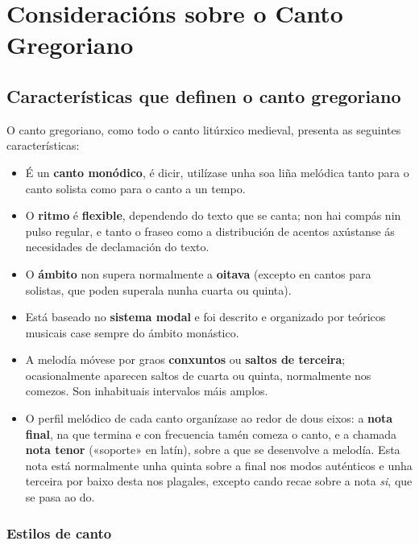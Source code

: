 \documentclass[a4paper, twoside]{templates/ociamthesis}
\providecommand{\tightlist}{%
  \setlength{\itemsep}{0pt}\setlength{\parskip}{0pt}}
\begin{document}
\newpage

\hypertarget{consideraciuxf3ns-sobre-o-canto-gregoriano}{%
\section{Consideracións sobre o Canto Gregoriano}\label{consideraciuxf3ns-sobre-o-canto-gregoriano}}

\hypertarget{caracteruxedsticas-que-definen-o-canto-gregoriano}{%
\subsection{Características que definen o canto gregoriano}\label{caracteruxedsticas-que-definen-o-canto-gregoriano}}

O canto gregoriano, como todo o canto litúrxico medieval, presenta as seguintes características:

\begin{itemize}
\tightlist
\item
  É un \textbf{canto monódico}, é dicir, utilízase unha soa liña melódica tanto para o canto solista como para o canto a un tempo.
\item
  O \textbf{ritmo} é \textbf{flexible}, dependendo do texto que se canta; non hai compás nin pulso regular, e tanto o fraseo como a distribución de acentos axústanse ás necesidades de declamación do texto.
\item
  O \textbf{ámbito} non supera normalmente a \textbf{oitava} (excepto en cantos para solistas, que poden superala nunha cuarta ou quinta).
\item
  Está baseado no \textbf{sistema modal} e foi descrito e organizado por teóricos musicais case sempre do ámbito monástico.
\item
  A melodía móvese por graos \textbf{conxuntos} ou \textbf{saltos de terceira}; ocasionalmente aparecen saltos de cuarta ou quinta, normalmente nos comezos. Son inhabituais intervalos máis amplos.
\item
  O perfil melódico de cada canto organízase ao redor de dous eixos: a \textbf{nota final}, na que termina e con frecuencia tamén comeza o canto, e a chamada \textbf{nota tenor} («soporte» en latín), sobre a que se desenvolve a melodía. Esta nota está normalmente unha quinta sobre a final nos modos auténticos e unha terceira por baixo desta nos plagales, excepto cando recae sobre a nota \emph{si}, que se pasa ao do.
\end{itemize}

\hypertarget{estilos-de-canto}{%
\subsubsection{Estilos de canto}\label{estilos-de-canto}}
\end{document}
